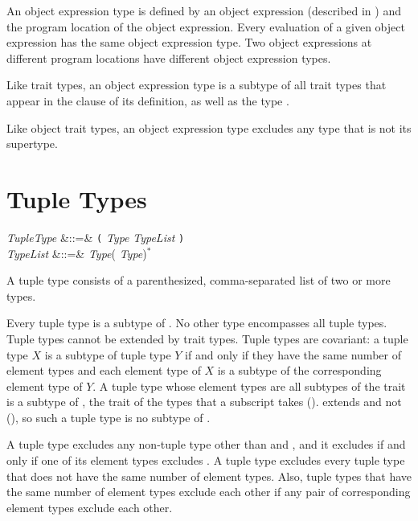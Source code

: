 An object expression type is defined by an object expression
(described in )
and the program location of the object expression.
Every evaluation of a given object expression has the same
object expression type.  Two object expressions at different program locations
have different object expression types.

Like trait types,
an object expression type is a subtype of all trait types
that appear in the  clause of its definition,
as well as the type .

Like object trait types,
an object expression type excludes any type that is not its supertype.


\section{Tuple Types}

\begin{Grammar}
\emph{TupleType} &::=&
\texttt{(} \emph{Type}\EXP{,} \emph{TypeList} \texttt{)}\\

\emph{TypeList} &::=& \emph{Type}(\EXP{,} \emph{Type})$^*$
\end{Grammar}

A tuple type consists of a parenthesized, comma-separated list
of two or more types.

Every tuple type is a subtype of .
No other type encompasses all tuple types.
Tuple types cannot be extended by trait types.
Tuple types are covariant:
a tuple type $X$ is a subtype of tuple type $Y$
if and only if they have the same number of element types
and each element type of $X$ is a subtype of the
corresponding element type of $Y$.
A tuple type whose element types are all subtypes of the trait 
is a subtype of , the trait of the types that a subscript takes
().
 extends  and not 
(),
so such a tuple type is no subtype of .

A tuple type excludes any non-tuple type
other than  and ,
and it excludes  if and only if one of its element types
excludes .
A tuple type excludes every tuple type that does not have the same
number of element types.
Also, tuple types that have the same number of element types exclude each other
if any pair of corresponding element types exclude each other.

